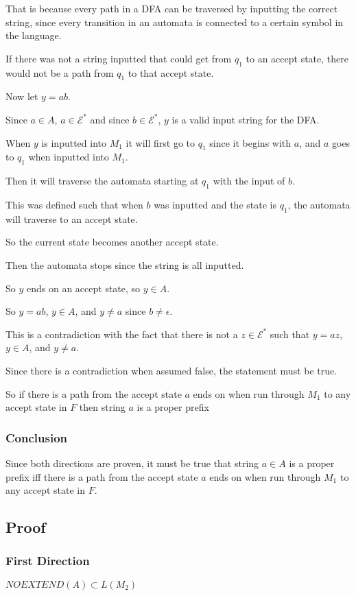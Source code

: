 \documentclass[letterpaper, 11pt]{article}
\begin{document}
That is because every path in a DFA can be traversed by inputting the correct string, since every transition in an automata is connected to a certain symbol in the language.

If there was not a string inputted that could get from $q_1$ to an accept state, there would not be a path from $q_1$ to that accept state.

Now let $y = ab$.

Since $a \in A$, $a \in \mathcal{E}^*$
and since $b \in \mathcal{E}^*$, $y$ is a valid input string for the DFA.

When $y$ is inputted into $M_1$ it will first go to $q_1$ since it begins with $a$, and $a$ goes to $q_1$ when inputted into $M_1$.

Then it will traverse the automata starting at $q_1$ with the input of $b$.

This was defined such that when $b$ was inputted and the state is $q_1$, the automata will traverse to an accept state.

So the current state becomes another accept state.

Then the automata stops since the string is all inputted.

So $y$ ends on an accept state, so $y \in A$.

So $y = ab$, $y \in A$, and $y \neq a$ since $b \neq \epsilon$.

This is a contradiction with the fact that there is not a $z \in \mathcal{E}^*$ such that $y = az$, $y \in A$, and $y \neq a$.

Since there is a contradiction when assumed false, the statement must be true.

So if there is a path from the accept state $a$ ends on when run through $M_1$ to any accept state in $F$ then string $a$ is a proper prefix

\subsubsection*{Conclusion}
Since both directions are proven, it must be true that string $a \in A$ is a proper prefix iff there is a path from the accept state $a$ ends on when run through $M_1$ to any accept state in $F$.

\subsection*{Proof}
\subsubsection*{First Direction}
$NOEXTEND(A) \subset L(M_2)$
\end{document}
